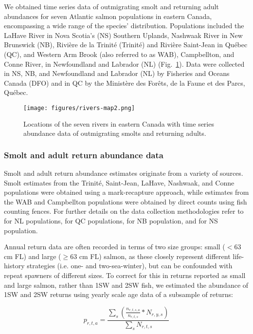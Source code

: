 \documentclass[12pt]{article}
\begin{document}
We obtained time series data of outmigrating smolt and returning adult
abundances for seven Atlantic salmon populations in eastern Canada, encompassing a
wide range of the species' distribution. 
Populations included the LaHave River in Nova Scotia's (NS) Southern Uplands, 
Nashwaak River in New Brunswick (NB), Rivi\`{e}re de la Trinit\'{e} (Trinit\'{e}) and
Rivi\`{e}re Saint-Jean in Qu\'{e}bec (QC), and Western Arm Brook (also referred to as WAB), 
Campbellton, and Conne River, in Newfoundland and Labrador (NL) (Fig.~\ref{fig:map}). 
Data were collected in NS, NB, and Newfoundland
and Labrador (NL) by Fisheries and Oceans Canada (DFO) and in QC
by the Minist\`{e}re des For\^{e}ts, de la Faune et des Parcs, Qu\'{e}bec.

\begin{figure}[htbp] \centering
    \texttt{[image: figures/rivers-map2.png]}
    \caption{Locations of the seven rivers in eastern Canada with time series abundance data of outmigrating smolts and 
    returning adults.} \label{fig:map} 
\end{figure}

\subsubsection*{Smolt and adult return abundance data}

Smolt and adult return abundance estimates originate from a variety of
sources. Smolt estimates from the Trinit\'{e}, Saint-Jean, LaHave, Nashwaak,
and Conne populations were obtained using a mark-recapture approach, while
estimates from the WAB and Campbellton populations were obtained by direct
counts using fish counting fences.
For further details on the data collection methodologies refer to 
\citet{Dempson1991, Venoitt2018} for NL populations, 
\citet{April2018}  for QC populations,
\citet{Jones2014} for NB population,
and \citet{Gibson2009} for NS population. 

Annual return data are often recorded in terms of two size groups: small ($< 63$ cm
FL) and large ($\geq 63$ cm FL) salmon, as these closely represent different
life-history strategies (i.e. one- and two-sea-winter), but can be confounded with repeat
spawners of different sizes. To correct for this in returns 
reported as small and large salmon, rather than 1SW and 2SW fish, we estimated the abundance
of 1SW and 2SW returns using yearly scale age data of a subsample of returns:

\begin{equation}
    p_{r,t,a} = \frac{\sum_{s}{(\frac{n_{r,t,s,a}}{n_{r,t,s}} * N_{r,y,s})}}{\sum_{s}{N_{r,t,s}}}
\end{equation}
\end{document}
